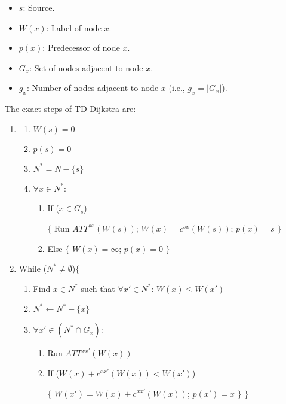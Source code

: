 \documentclass[conference]{IEEEtran}
\begin{document}
\begin{itemize}
    \item $s$: Source.
    \item $W(x)$: Label of node $x$. 
    \item $p(x)$: Predecessor of node $x$. 
    \item $G_x$: Set of nodes adjacent to node $x$.
    \item $g_x$: Number of nodes adjacent to node $x$ (i.e., $g_x=|G_x|$).
\end{itemize}

The exact steps of TD-Dijkstra are: 
\begin{enumerate}
    \item \label{step1}
    \begin{enumerate}
        \item $W(s)=0$
        \item $p(s)=0$
        \item $N^*=N-\{s\}$
        \item $ \forall x\in N^*$: 
        \begin{enumerate}
            \item If ($x\in G_s$) 
            
            $\{$ Run $ATT^{sx}(W(s))$; $W(x)=c^{sx}(W(s))$; $p(x)=s$ $\}$ \label{stepa}
            \item Else $\{$ $W(x)=\infty$; $p(x)=0$ $\}$
        \end{enumerate}    
    \end{enumerate}
    \item While ($N^*\neq \emptyset$)$\{$ \label{step2}
    \begin{enumerate}
        \item Find $x\in N^*$ such that $\forall x'\in N^*$: $W(x)\leq W(x')$ 
        \item $N^*\leftarrow N^*-\{x\}$
        \item $\forall x'\in (N^*\cap G_x)$: 
         \begin{enumerate}
            \item Run $ATT^{xx'}(W(x))$ \label{stepb}
            \item If ($W(x)+c^{xx'}(W(x))<W(x')$) 
            
            $\{$ $W(x')=W(x)+c^{xx'}(W(x))$; $p(x')=x$ $\}$ $\}$ 
         \end{enumerate}   
    \end{enumerate}
\end{enumerate}
\end{document}
